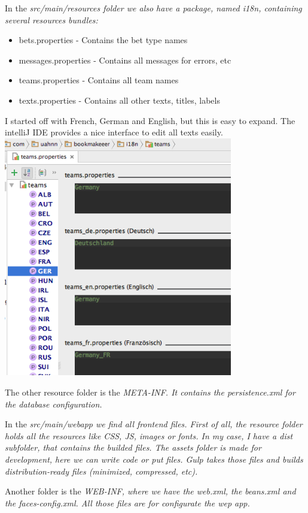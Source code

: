 \documentclass[11pt, halfparskip]{scrreprt}
\begin{document}
In the \em{src/main/resources} folder we also have a package, named \em{i18n}, containing several resources bundles:
\begin{itemize}
\item bets.properties - Contains the bet type names
\item messages.properties - Contains all messages for errors, etc
\item teams.properties - Contains all team names
\item texts.properties - Contains all other texts, titles, labels
\end{itemize}

I started off with French, German and English, but this is easy to expand. The intelliJ IDE provides a nice interface to edit all texts easily.
\includegraphics[width=10cm]{i18n-edit.png}

The other resource folder is the \em{META-INF}. It contains the \em{persistence.xml} for the database configuration. 

In the \em{src/main/webapp} we find all frontend files. First of all, the \em{resource} folder holds all the resources like CSS, JS, images or fonts. In my case, I have a \em{dist} subfolder, that contains the builded files. The \em{assets} folder is made for development, here we can write code or put files. Gulp takes those files and builds distribution-ready files (minimized, compressed, etc). 

Another folder is the \em{WEB-INF}, where we have the \em{web.xml}, the \em{beans.xml} and the \em{faces-config.xml}. All those files are for configurate the wep app.
\end{document}
